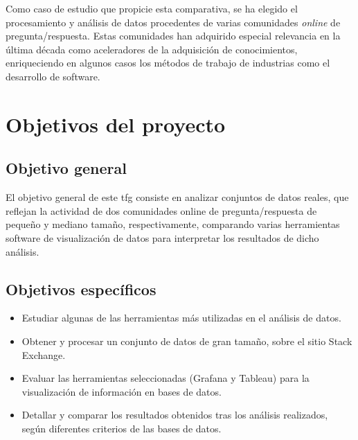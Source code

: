 \documentclass[a4paper, 12pt]{book}
\begin{document}
Como caso de estudio que propicie esta comparativa, se ha elegido el procesamiento y análisis de datos procedentes de varias comunidades \textit{online} de pregunta/respuesta. Estas comunidades han adquirido especial relevancia en la última década como aceleradores de la adquisición de conocimientos, enriqueciendo en algunos casos los métodos de trabajo de industrias como el desarrollo de software.



\section{Objetivos del proyecto}
\label{sec:objetivos}

\subsection{Objetivo general} %
\label{sec:objetivo-general} %


El objetivo general de este \gls{tfg} consiste en analizar conjuntos de datos reales, que reflejan la actividad de dos comunidades online de pregunta/respuesta de pequeño y mediano tamaño, respectivamente, comparando varias herramientas software de visualización de datos para interpretar los resultados de dicho análisis.

\subsection{Objetivos específicos}
\label{sec:objetivos-especificos}

    \begin{itemize}
        \item Estudiar algunas de las herramientas más utilizadas en el análisis de datos.
        \item Obtener y procesar un conjunto de datos de gran tamaño, sobre el sitio Stack Exchange.
        \item Evaluar las herramientas seleccionadas (Grafana y Tableau) para la visualización de información en bases de datos.
        \item Detallar y comparar los resultados obtenidos tras los análisis realizados, según diferentes criterios de las bases de datos.
    \end{itemize}
\end{document}
